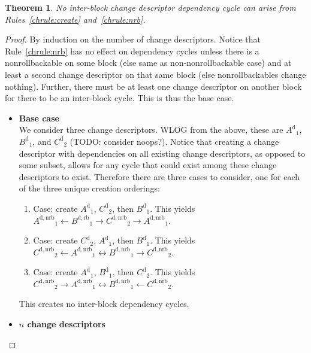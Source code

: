 \documentclass{article}
\newtheorem{thm}{Theorem}[section]
\theoremstyle{definition}
\newcommand{\cd}[1]{\ensuremath{#1}}
\newcommand{\cdb}[2]{\ensuremath{\cd{#1}_#2}}
\newcommand{\dcd}[1]{\ensuremath{\cd{#1}^\mathrm{d}}}
\newcommand{\drb}[1]{\ensuremath{\cd{#1}^\mathrm{d,rb}}}
\newcommand{\dnrb}[1]{\ensuremath{\cd{#1}^\mathrm{d,nrb}}}
\newcommand{\depends}[2]{\ensuremath{#1\! \rightarrow\! #2}}
\newcommand{\ldepends}[2]{\ensuremath{#1\! \leftarrow\! #2}}
\newcommand{\cycledepends}[2]{\ensuremath{#1\! \leftrightarrow\! #2}}
\begin{document}
\begin{thm}\label{thm:nrbsafe}
  No inter-block change descriptor dependency cycle can arise from
  Rules~\ref{chrule:create} and~\ref{chrule:nrb}.
\end{thm}
\begin{proof}
  By induction on the number of change descriptors.
  Notice that Rule~\ref{chrule:nrb} has no effect on dependency cycles
  unless there is a nonrollbackable on some block (else same as
  non-nonrollbackable case) and at least a second change descriptor on
  that same block (else nonrollbackables change nothing).
  Further, there must be at least one change descriptor on another
  block for there to be an inter-block cycle. This is thus the base
  case.
  \begin{itemize}
  \item \textbf{Base case}\\
    We consider three change descriptors. WLOG from the above, these
    are \cdb{\dcd{A}}{1}, \cdb{\dcd{B}}{1}, and \cdb{\dcd{C}}{2}
    (TODO: consider noops?).
    Notice that creating a change descriptor with dependencies on all
    existing change descriptors, as opposed to some subset, allows for
    any cycle that could exist among these change descriptors to
    exist. Therefore there are three cases to consider, one for each
    of the three unique creation orderings:
    \begin{enumerate}
    \item Case: create \cdb{\dcd{A}}{1}, \cdb{\dcd{C}}{2},
      then \cdb{\dcd{B}}{1}. This yields
      \ldepends{\cdb{\dnrb{A}}{1}}
               {\depends{\depends{\cdb{\drb{B}}{1}}
                                 {\cdb{\dnrb{C}}{2}}}
                        {\cdb{\dnrb{A}}{1}}}.
    \item Case: create \cdb{\dcd{C}}{2}, \cdb{\dcd{A}}{1},
      then \cdb{\dcd{B}}{1}. This yields
      \ldepends{\cdb{\dnrb{C}}{2}}
               {\depends{\cycledepends{\cdb{\dnrb{A}}{1}}
                                      {\cdb{\dnrb{B}}{1}}}
                        {\cdb{\dnrb{C}}{2}}}.
    \item Case: create \cdb{\dcd{A}}{1}, \cdb{\dcd{B}}{1},
      then \cdb{\dcd{C}}{2}. This yields
      \depends{\cdb{\dnrb{C}}{2}}
              {\cycledepends{\cdb{\dnrb{A}}{1}}
                            {\ldepends{\cdb{\dnrb{B}}{1}}
                                      {\cdb{\dnrb{C}}{2}}}}.
    \end{enumerate}
    This creates no inter-block dependency cycles.
    \item \textbf{$n$ change descriptors}\\

\end{itemize}
\end{proof}
\end{document}
